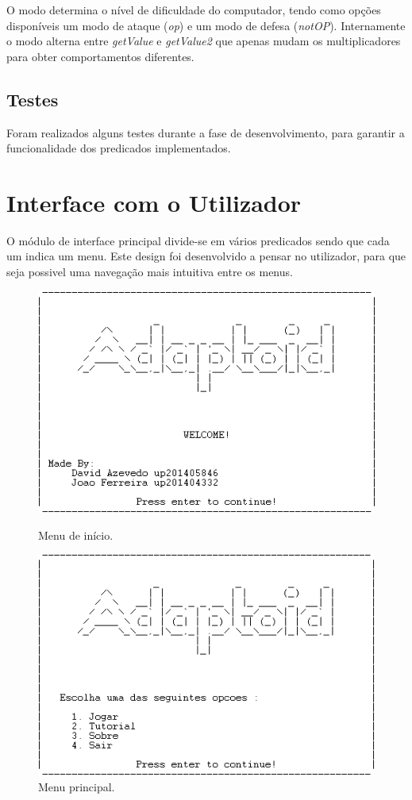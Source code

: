 \documentclass[a4paper]{article}
\begin{document}
O modo determina o nível de dificuldade do computador, tendo como opções disponíveis um modo de ataque (\textit{op}) e um modo de defesa (\textit{notOP}). Internamente o modo alterna entre \textit{getValue} e \textit{getValue2} que apenas mudam os multiplicadores para obter comportamentos diferentes.

\subsection{Testes}

Foram realizados alguns testes durante a fase de desenvolvimento, para garantir a funcionalidade dos predicados implementados.


\newpage
\section{Interface com o Utilizador}

O módulo de interface principal divide-se em vários predicados sendo que cada um indica um menu. Este design foi desenvolvido a pensar no utilizador, para que seja possivel uma navegação mais intuitiva entre os menus.
\begin{figure}[h]
    \begin{minipage}[b]{0.4\textwidth}
        \includegraphics[scale=0.5]{menuPrincipal}
        \caption{Menu de início.}
    \end{minipage}
    \begin{minipage}[b]{0.4\textwidth}
        \includegraphics[scale=0.5]{menuEscolha}
        \caption{Menu principal.}
    \end{minipage}
\end{figure}
\end{document}
